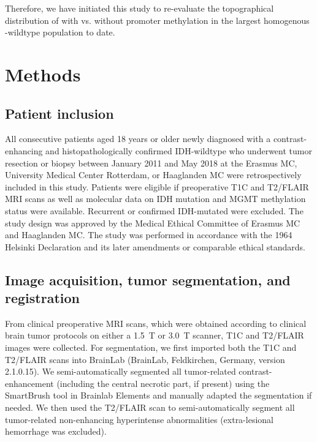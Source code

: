 Therefore, we have initiated this study to re-evaluate the topographical distribution of  with vs. without  promoter methylation in the largest homogenous -wildtype  population to date.

\section{Methods}
\subsection{Patient inclusion}

All consecutive patients aged 18 years or older newly diagnosed with a contrast-enhancing and histopathologically confirmed  \gls{IDH}-wildtype who underwent \gls{tumor} resection or biopsy between January 2011 and May 2018 at the Erasmus MC, University Medical Center Rotterdam, or Haaglanden MC were retrospectively included in this study.
Patients were eligible if preoperative  \gls{T1C} and \gls{T2}/\gls{FLAIR} \gls{MRI} scans as well as molecular data on \gls{IDH} mutation and \gls{MGMT} methylation status were available.
Recurrent  or confirmed \gls{IDH}-mutated  were excluded.
The study design was approved by the Medical Ethical Committee of Erasmus MC and Haaglanden MC.
The study was performed in accordance with the 1964 Helsinki Declaration and its later amendments or comparable ethical standards.

\subsection{Image acquisition, \gls{tumor} segmentation, and registration}
From clinical preoperative \gls{MRI} scans, which were obtained according to clinical brain \gls{tumor} protocols on either a \SI{1.5}{\tesla} or \SI{3.0}{\tesla} scanner, \gls{T1C} and \gls{T2}/\gls{FLAIR} images were collected.
For  segmentation, we first imported both the \gls{T1C} and \gls{T2}/\gls{FLAIR} scans into BrainLab (BrainLab, Feldkirchen, Germany, version 2.1.0.15).
We semi-automatically segmented all \gls{tumor}-related contrast-enhancement (including the central necrotic part, if present) using the SmartBrush tool in Brainlab Elements and manually adapted the segmentation if needed.
We then used the \gls{T2}/\gls{FLAIR} scan to semi-automatically segment all \gls{tumor}-related non-enhancing hyperintense abnormalities (extra-lesional hemorrhage was excluded).

